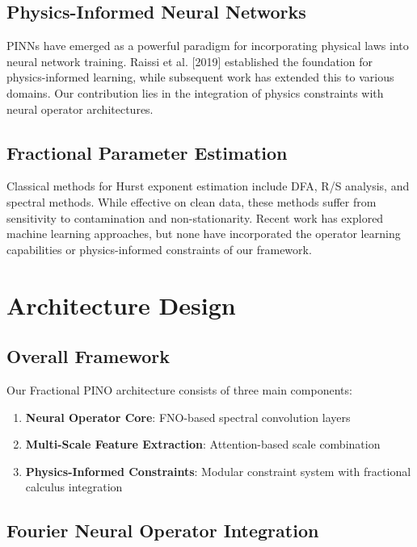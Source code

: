 \documentclass[11pt,a4paper]{article}
\begin{document}
\subsection{Physics-Informed Neural Networks}

PINNs have emerged as a powerful paradigm for incorporating physical laws into neural network training. Raissi et al. [2019] established the foundation for physics-informed learning, while subsequent work has extended this to various domains. Our contribution lies in the integration of physics constraints with neural operator architectures.

\subsection{Fractional Parameter Estimation}

Classical methods for Hurst exponent estimation include DFA, R/S analysis, and spectral methods. While effective on clean data, these methods suffer from sensitivity to contamination and non-stationarity. Recent work has explored machine learning approaches, but none have incorporated the operator learning capabilities or physics-informed constraints of our framework.

\section{Architecture Design}

\subsection{Overall Framework}

Our Fractional PINO architecture consists of three main components:

\begin{enumerate}
    \item \textbf{Neural Operator Core}: FNO-based spectral convolution layers
    \item \textbf{Multi-Scale Feature Extraction}: Attention-based scale combination
    \item \textbf{Physics-Informed Constraints}: Modular constraint system with fractional calculus integration
\end{enumerate}

\subsection{Fourier Neural Operator Integration}
\end{document}
